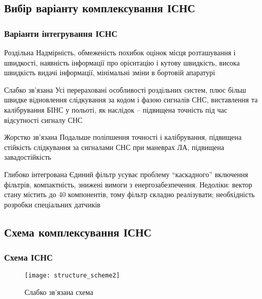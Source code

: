 \documentclass[ucs,compress]{beamer}    %
\begin{document}
\subsection{Вибір варіанту комплексування ІСНС } 
\begin{frame}\frametitle{Варіанти інтегрування ІСНС} 

\tiny
\begin{block}{Роздільна}
Надмірність, обмеженість похибок оцінок місця розташування і швидкості, 
наявність інформації про орієнтацію і кутову швидкість, висока швидкість видачі інформації, 
мінімальні зміни в бортовій апаратурі
\end{block}

\begin{exampleblock}{Слабко зв'язана}
Усі перераховані особливості роздільних систем, плюс більш 
швидке відновлення слідкування за кодом і фазою сигналів СНС, виставлення та калібрування 
БІНС у польоті, як наслідок -- підвищена точність під час відсутності сигналу СНС
\end{exampleblock}


\begin{block}{Жорстко зв'язана}
Подальше поліпшення точності і калібрування, підвищена стійкість слідкування 
за сигналами СНС при маневрах ЛА, підвищена завадостійкість 
\end{block}

\begin{block}{Глибоко інтегрована}
Єдиний фільтр усуває проблему ``каскадного'' включення 
фільтрів, компактність, знижені вимоги з енергозабезпечення. Недоліки: вектор стану 
містить до 40 компонентів, тому фільтр складно реалізувати; необхідність розробки 
спеціальних датчиків 
\end{block}
\end{frame}


\subsection{Схема комплексування ІСНС }
\begin{frame} \frametitle{Схема ІСНС} 
\begin{figure}[here]
\centering
\texttt{[image: structure\_scheme2]}
\caption{Слабко зв’язана схема}
\end{figure}
\end{frame}
\end{document}
